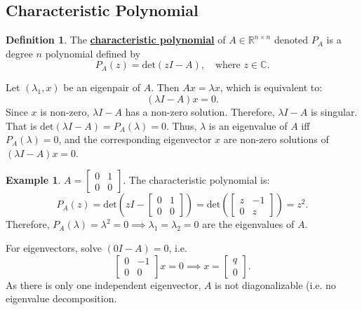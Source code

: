 \documentclass[12pt]{article}
\theoremstyle{definition}
\newtheorem{definition}{Definition}
\newtheorem{example}{Example}[section]
\theoremstyle{remark}
\newcommand{\R}{\mathbb{R}}
\newcommand{\C}{\mathbb{C}}
\begin{document}
\subsection{Characteristic Polynomial}
\begin{definition}
	The \underline{\textbf{characteristic polynomial}} of $A\in \R^{n\times n}$ denoted $P_A$ is a degree $n$ polynomial defined by \[
		P_A(z)=\text{det}(zI-A),\quad \text{where }z\in\C
	.\] 
\end{definition}
Let $\left( \lambda_1,x \right) $ be an eigenpair of $A$. Then $Ax=\lambda x$, which is equivalent to: \[
	\left( \lambda I-A \right) x=0
.\] 
Since $x$ is non-zero, $\lambda I-A$ has a non-zero solution. Therefore,  $\lambda I-A$ is singular. That is $\text{det}(\lambda I-A)=P_A(\lambda)=0$. Thus, $\lambda$ is an eigenvalue of $A$ iff $P_A(\lambda)=0$, and the corresponding eigenvector  $x$ are non-zero solutions of $\left( \lambda I-A \right) x=0$.
\begin{example}
	$A=\begin{bmatrix} 0&1\\0 &0 \end{bmatrix} $. The characteristic polynomial is: \[
		P_A(z)=\text{det}\left(zI-\begin{bmatrix} 0&1\\0&0 \end{bmatrix} \right)=\text{det}\left( \begin{bmatrix} z&-1\\0&z \end{bmatrix}  \right) =z^2
	.\] Therefore, $P_A(\lambda)=\lambda^2=0\implies \lambda_1=\lambda_2=0$ are the eigenvalues of $A$.
	
	For eigenvectors, solve $(0I-A)=0$, i.e. \[
	\begin{bmatrix} 0&-1\\0&0 \end{bmatrix} x=0\implies x=\begin{bmatrix} q\\0 \end{bmatrix} 
.\] As there is only one independent eigenvector, $A$ is not diagonalizable (i.e. no eigenvalue decomposition.
\end{example}
\end{document}
